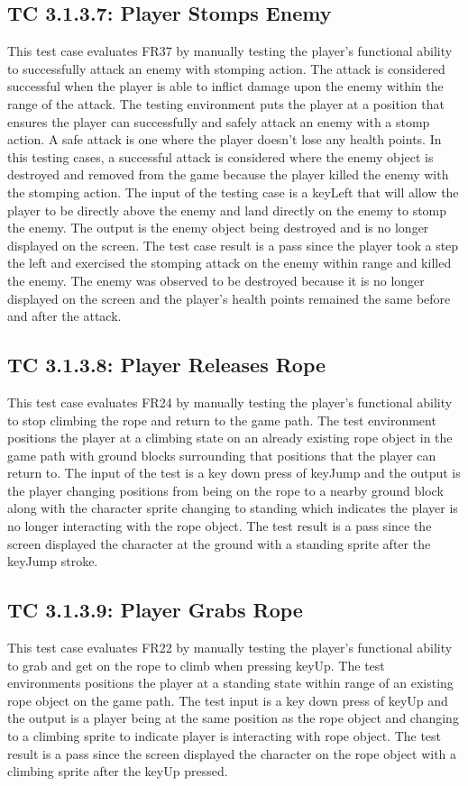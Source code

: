 \documentclass[12pt, titlepage]{article}
\begin{document}
\subsection*{TC 3.1.3.7: Player Stomps Enemy}
This test case evaluates FR37 by manually testing the player's functional ability to successfully attack an enemy with stomping action. The attack is considered successful when the player is able to inflict damage upon the enemy within the range of the attack. The testing environment puts the player at a position that ensures the player can successfully and safely attack an enemy with a stomp action. A safe attack is one where the player doesn't lose any health points. In this testing cases, a successful attack is considered where the enemy object is destroyed and removed from the game because the player killed the enemy with the stomping action. The input of the testing case is a keyLeft that will allow the player to be directly above the enemy and land directly on the enemy to stomp the enemy. The output is the enemy object being destroyed and is no longer displayed on the screen. The test case result is a pass since the player took a step the left and exercised the stomping attack on the enemy within range and killed the enemy. The enemy was observed to be destroyed because it is no longer displayed on the screen and the player's health points remained the same before and after the attack. 

\subsection*{TC 3.1.3.8: Player Releases Rope}
This test case evaluates FR24 by manually testing the player's functional ability to stop climbing the rope and return to the game path. The test environment positions the player at a climbing state on an already existing rope object in the game path with ground blocks surrounding that positions that the player can return to. The input of the test is a key down press of keyJump and the output is the player changing positions from being on the rope to a nearby ground block along with the character sprite changing to standing which indicates the player is no longer interacting with the rope object. The test result is a pass since the screen displayed the character at the ground with a standing sprite after the keyJump stroke. 

\subsection*{TC 3.1.3.9: Player Grabs Rope}
This test case evaluates FR22 by manually testing the player's functional ability to grab and get on the rope to climb when pressing keyUp. The test environments positions the player at a standing state within range of an existing rope object on the game path. The test input is a key down press of keyUp and the output is a player being at the same position as the rope object and changing to a climbing sprite to indicate player is interacting with rope object. The test result is a pass since the screen displayed the character on the rope object with a climbing sprite after the keyUp pressed. 
\end{document}
